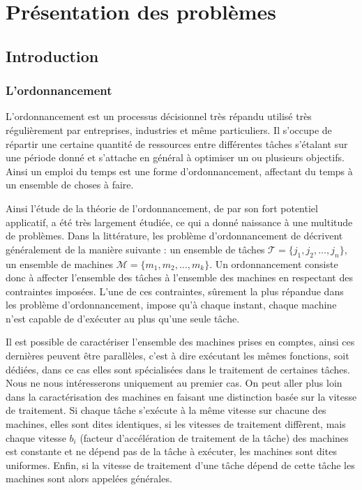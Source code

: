 \documentclass[a4paper,9pt]{report}
\begin{document}
%


\chapter{Pr\'{e}sentation des problèmes}


\section{Introduction}
\subsection{L'ordonnancement}

L'ordonnancement est un processus décisionnel très répandu utilisé très régulièrement par
entreprises, industries et même particuliers.  Il s'occupe de répartir une certaine quantité de
ressources entre différentes tâches s'étalant sur une période donné et s'attache en général à
optimiser un ou plusieurs objectifs. Ainsi un emploi du temps est une forme d'ordonnancement,
affectant du temps à un ensemble de choses à faire.

Ainsi l'étude de la théorie de l'ordonnancement, de par son fort potentiel applicatif, a été très
largement étudiée, ce qui a donné naissance à une multitude de problèmes. Dans la littérature, les
problème d'ordonnancement de décrivent généralement de la manière suivante : un ensemble de tâches
$\mathcal{T} = \{j_1, j_2, \dots, j_n\}$, un ensemble de machines $\mathcal{M} = \{m_1, m_2, \dots,
m_k\}$. Un ordonnancement consiste donc à affecter l'ensemble des tâches à l'ensemble des machines
en respectant des contraintes imposées. L'une de ces contraintes, sûrement la plus répandue dans les
problème d'ordonnancement, impose qu'à chaque instant, chaque machine n'est capable de d'exécuter au
plus qu'une seule tâche.

Il est possible de caractériser l'ensemble des machines prises en comptes, ainsi ces dernières
peuvent être parallèles, c'est à dire exécutant les mêmes fonctions, soit dédiées, dans ce cas elles
sont spécialisées dans le traitement de certaines tâches. Nous ne nous intéresserons uniquement au
premier cas. On peut aller plus loin dans la caractérisation des machines en faisant une distinction
basée sur la vitesse de traitement. Si chaque tâche s'exécute à la même vitesse sur chacune des
machines, elles sont dites identiques, si les vitesses de traitement diffèrent, mais chaque vitesse
$b_i$ (facteur d'accélération de traitement de la tâche) des machines est constante et ne dépend
pas de la tâche à exécuter, les machines sont dites uniformes. Enfin, si la vitesse de traitement
d'une tâche dépend de cette tâche les machines sont alors appelées générales.
\end{document}
